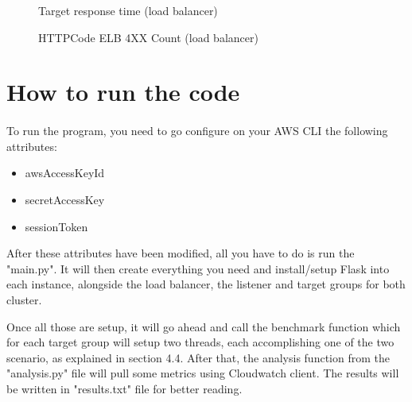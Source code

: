 \documentclass[12pt]{article}
\begin{document}
            \begin{figure}[htpb]
                \centering
                    \caption{Target response time (load balancer)}
                    \label{fig:targetresponsetimeelb}
                \end{figure}
        \begin{figure}[htpb]
                \centering
                    \caption{HTTPCode ELB 4XX Count (load balancer)}
                    \label{fig:httpelb}
                \end{figure}
           
           


                            
        




	\pagebreak


\section{How to run the code} \label{sec:runcode}
	\paragraph{} To run the program, you need to go configure on your AWS CLI the following attributes:
	\begin{itemize}
      \item awsAccessKeyId
      \item secretAccessKey
      \item sessionToken
    \end{itemize}
    After these attributes have been modified, all you have to do is run the "main.py". It will then
	create everything you need and install/setup Flask into each instance, alongside the load balancer, the listener and target groups for both cluster. 
	
	\bigskip
	
	Once all those are setup, it will go ahead and call the benchmark function which for each target group will setup two threads, each accomplishing one of the two scenario, as explained in section 4.4. After that, the analysis function from the "analysis.py" file will pull some metrics using Cloudwatch client. The results will be written in "results.txt" file for better reading. 
	
\end{document}
